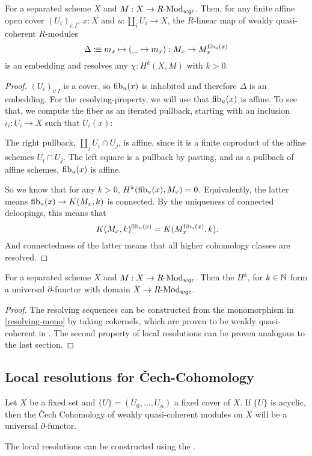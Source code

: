 \begin{remark}
  \label{resolving-mono}
  For a separated scheme $X$ and $M:X\to R\text{-}\mathrm{Mod}_{wqc}$.
  Then, for any finite affine open cover $(U_i)_{i:I}$, $x:X$
  and $u:\coprod_i U_i\to X$,
  the $R$-linear map of weakly quasi-coherent $R$-modules
  \[ \Delta\vcentcolon\mspace{-1.2mu}\equiv m_x\mapsto (\_\mapsto m_x):M_x\to M_x^{\mathrm{fib}_u(x)}\]
  is an embedding and resolves any $\chi:H^k(X,M)$ with $k>0$.
\end{remark}

\begin{proof}
  $(U_i)_{i:I}$ is a cover, so $\mathrm{fib}_u(x)$ is inhabited and therefore $\Delta$ is an embedding.
  For the resolving-property, we will use that $\mathrm{fib}_u(x)$ is affine.
  To see that,
  we compute the fiber as an iterated pullback,
  starting with an inclusion $\iota_i:U_i\to X$ such that $U_i(x)$:
  \begin{center}
  \end{center}
  The right pullback, $\coprod_j U_i\cap U_j$, is affine, since it is a finite coproduct of the affine schemes $U_i\cap U_j$.
  The left square is a pullback by pasting, and as a pullback of affine schemes, $\mathrm{fib}_u(x)$ is affine.

  So we know that for any $k>0$, $H^k(\mathrm{fib}_u(x),M_x)=0$.
  Equivalently, the latter means $\mathrm{fib}_u(x)\to K(M_x,k)$ is connected.
  By the uniqueness of connected deloopings, this means that
  \[
    K(M_x,k)^{\fib_u(x)} = K(M_x^{\fib_u(x)},k)
    \rlap{.}
  \]
  And connectedness of the latter means that all higher cohomology classes are resolved.
\end{proof}

\begin{theorem}
  For a separated scheme $X$ and $M:X\to R\text{-}\mathrm{Mod}_{wqc}$.
  Then the $H^k$, for $k\in\mathbb{N}$ form a universal $\partial$-functor with domain $X\to R\text{-}\mathrm{Mod}_{wqc}$.
\end{theorem}

\begin{proof}
  The resolving sequences can be constructed from the monomorphism in \cref{resolving-mono}
  by taking cokernels, which are proven to be weakly quasi-coherent in \cite{draft}.
  The second property of local resolutions can be proven analogous to the last section.
\end{proof}

\subsection{Local resolutions for \v{C}ech-Cohomology}

Let $X$ be a fixed set and $\{U\}=(U_0,\dots,U_n)$ a fixed cover of $X$.
If $\{U\}$ is acyclic, then the \v{C}ech Cohomology of weakly quasi-coherent modules on $X$
will be a universal $\partial$-functor.

The local resolutions can be constructed using the .
